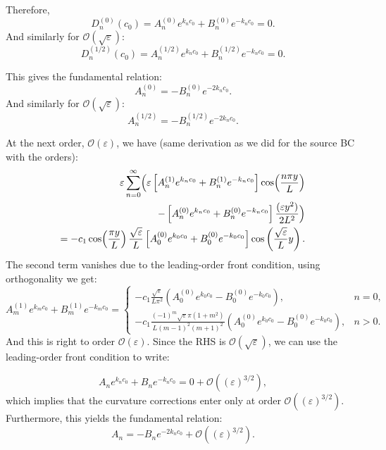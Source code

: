 \documentclass{article}
\begin{document}
Therefore,
\begin{equation}
D_n^{(0)}(c_0) = A_n^{(0)}e^{k_n c_0} + B_n^{(0)}e^{-k_n c_0} = 0.
\end{equation}
And similarly for $\mathcal{O}(\sqrt{\varepsilon})$:
\begin{equation}
D_n^{(1/2)}(c_0) = A_n^{(1/2)}e^{k_n c_0} + B_n^{(1/2)}e^{-k_n c_0} = 0.
\end{equation}

This gives the fundamental relation:
\[
A_n^{(0)} = - B_n^{(0)} e^{-2k_n c_0}.
\]
And similarly for $\mathcal{O}(\sqrt{\varepsilon})$:
\[
A_n^{(1/2)} = - B_n^{(1/2)} e^{-2k_n c_0}.
\]

At the next order, $\mathcal{O}(\varepsilon)$, we have (same derivation as we did for the source BC with the orders):
\begin{equation}
    \begin{split}
        \varepsilon \sum_{n=0}^\infty \Bigl(
        \varepsilon\left[A_n^{(1)}e^{k_n c_0} + B_n^{(1)}e^{-k_n c_0}\right] \cos\!\left(\frac{n\pi y}{L}\right)
        \\ - \left[A_n^{(0)} e^{k_n c_0} + B_n^{(0)}e^{-k_n c_0}\right]\frac{(\varepsilon y^2)}{2L^2}
        \Bigr) \\
        = - c_1 \cos\!\left(\frac{\pi y}{L}\right) \frac{\sqrt{\varepsilon}}{L} \left[A_0^{(0)} e^{k_0 c_0} + B_0^{(0)}e^{-k_0 c_0}\right] \cos\left(\frac{\sqrt{\varepsilon}}{L} y\right).
    \end{split}
\end{equation}
The second term vanishes due to the leading-order front condition, using orthogonality we get:
\begin{equation}
    A_m^{(1)} e^{k_m c_0} + B_m^{(1)} e^{-k_m c_0} =
    \begin{cases}
        -c_1 \frac{\sqrt{\varepsilon}}{L\pi^2}\left(A_0^{(0)} e^{k_0 c_0} - B_0^{(0)}e^{-k_0 c_0}\right), & n=0,\\[6pt]
        -c_1 \frac{(-1)^m \sqrt{\varepsilon} \pi (1+m^2)}{L(m-1)^2(m+1)^2}\left(A_0^{(0)} e^{k_0 c_0} - B_0^{(0)}e^{-k_0 c_0}\right), & n>0.
    \end{cases}
\end{equation}
And this is right to order $\mathcal{O}(\varepsilon)$. Since the RHS is $\mathcal{O}(\sqrt{\varepsilon})$, we can use the leading-order front condition to write:

\begin{equation}
A_n e^{k_n c_0} + B_n e^{-k_n c_0} = 0 + \mathcal{O}((\varepsilon)^{3/2}),
\end{equation}
which implies that the curvature corrections enter only at order $\mathcal{O}((\varepsilon)^{3/2})$. Furthermore, this yields the fundamental relation:
\[ 
A_n = - B_n e^{-2k_n c_0} + \mathcal{O}((\varepsilon)^{3/2}).
\]
\end{document}
